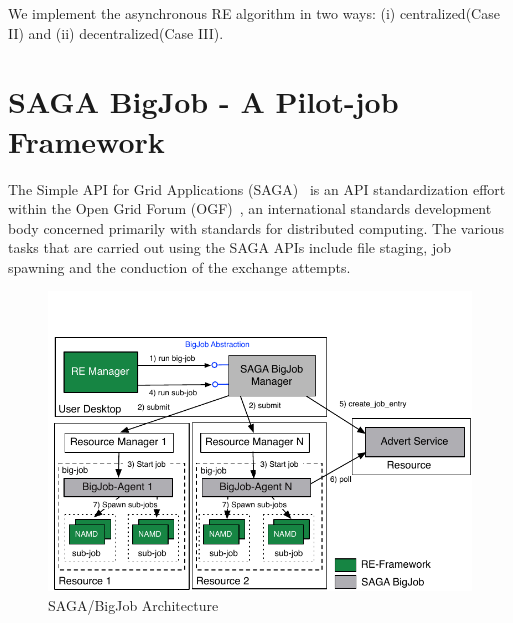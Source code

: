 \documentclass[a4paper,10pt]{article}
\newcommand{\alnote}[1]{ {\textcolor{blue} { ***andre: #1 }}}
\newcommand{\athotanote}[1]{ {\textcolor{green} { ***athota: #1 }}}
\newcommand{\alnote}[1]{}
\newcommand{\athotanote}[1]{}
\begin{document}
We implement the asynchronous RE algorithm in two ways: (i) centralized(Case II) and (ii) decentralized(Case III).




\section{SAGA BigJob - A Pilot-job Framework}

The Simple API for Grid Applications (SAGA)~\cite{saga_gfd90} is an API standardization effort within the Open Grid Forum (OGF)~\cite{ogf_web}, an international standards development body concerned primarily with standards for distributed computing. The various tasks that are carried out using the SAGA APIs include file staging, job spawning and the conduction of the exchange attempts.


 \begin{figure}
 \centering
 \includegraphics[scale=0.6]{figures/Bigjob_arch.pdf}
 \caption{\small SAGA/BigJob Architecture}
 \label{fig:centralized}
 \end{figure}
\end{document}
